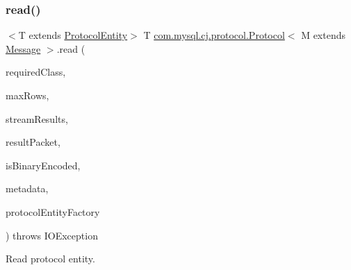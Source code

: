 \mbox{\label{interfacecom_1_1mysql_1_1cj_1_1protocol_1_1_protocol_ae33a71067b314435408526d35f521207}} 
\subsubsection{\texorpdfstring{read()}{read()}}
{\footnotesize\ttfamily $<$T extends \mbox{\hyperlink{interfacecom_1_1mysql_1_1cj_1_1protocol_1_1_protocol_entity}{Protocol\+Entity}}$>$ T \mbox{\hyperlink{interfacecom_1_1mysql_1_1cj_1_1protocol_1_1_protocol}{com.\+mysql.\+cj.\+protocol.\+Protocol}}$<$ M extends \mbox{\hyperlink{interfacecom_1_1mysql_1_1cj_1_1protocol_1_1_message}{Message}} $>$.read (\begin{DoxyParamCaption}\item[{Class$<$ \mbox{\hyperlink{interfacecom_1_1mysql_1_1cj_1_1protocol_1_1_resultset}{Resultset}} $>$}]{required\+Class,  }\item[{int}]{max\+Rows,  }\item[{boolean}]{stream\+Results,  }\item[{M}]{result\+Packet,  }\item[{boolean}]{is\+Binary\+Encoded,  }\item[{\mbox{\hyperlink{interfacecom_1_1mysql_1_1cj_1_1protocol_1_1_column_definition}{Column\+Definition}}}]{metadata,  }\item[{\mbox{\hyperlink{interfacecom_1_1mysql_1_1cj_1_1protocol_1_1_protocol_entity_factory}{Protocol\+Entity\+Factory}}$<$ T, M $>$}]{protocol\+Entity\+Factory }\end{DoxyParamCaption}) throws I\+O\+Exception}

Read protocol entity.


